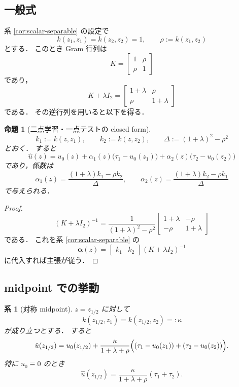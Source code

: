 \documentclass[a4paper,11pt]{bxjsarticle}
\newtheorem{proposition}[theorem]{命題}
\newtheorem{corollary}[theorem]{系}
\theoremstyle{definition}
\begin{document}
\subsection{一般式}

系 \ref{cor:scalar-separable} の設定で
\[
k(z_1,z_1)=k(z_2,z_2)=1,\qquad \rho:=k(z_1,z_2)
\]
とする．
このとき Gram 行列は
\[
K=
\begin{bmatrix}
1 & \rho\\
\rho & 1
\end{bmatrix}
\]
であり，
\[
K+\lambda I_2=
\begin{bmatrix}
1+\lambda & \rho\\
\rho & 1+\lambda
\end{bmatrix}
\]
である．
その逆行列を用いると以下を得る．

\begin{proposition}[二点学習・一点テストの closed form]
\label{prop:two-point-closed}
\[
k_1:=k(z,z_1),\qquad k_2:=k(z,z_2),\qquad
\Delta:=(1+\lambda)^2-\rho^2
\]
とおく．
すると
\[
\hat u(z)=u_0(z)+\alpha_1(z)\bigl(\tau_1-u_0(z_1)\bigr)+\alpha_2(z)\bigl(\tau_2-u_0(z_2)\bigr)
\]
であり，係数は
\[
\alpha_1(z)=\frac{(1+\lambda)k_1-\rho k_2}{\Delta},
\qquad
\alpha_2(z)=\frac{(1+\lambda)k_2-\rho k_1}{\Delta}
\]
で与えられる．
\end{proposition}

\begin{proof}
\[
(K+\lambda I_2)^{-1}
=
\frac{1}{(1+\lambda)^2-\rho^2}
\begin{bmatrix}
1+\lambda & -\rho\\
-\rho & 1+\lambda
\end{bmatrix}
\]
である．
これを系 \ref{cor:scalar-separable} の
\[
\bm{\alpha}(z)=\begin{bmatrix}k_1 & k_2\end{bmatrix}(K+\lambda I_2)^{-1}
\]
に代入すれば主張が従う．
\end{proof}

\subsection{midpoint での挙動}

\begin{corollary}[対称 midpoint]
\label{cor:midpoint}
$z=z_{1/2}$ に対して
\[
k(z_{1/2},z_1)=k(z_{1/2},z_2)=:\kappa
\]
が成り立つとする．
すると
\[
\hat u(z_{1/2})
=
u_0(z_{1/2})
+
\frac{\kappa}{1+\lambda+\rho}
\Bigl((\tau_1-u_0(z_1))+(\tau_2-u_0(z_2))\Bigr).
\]
特に $u_0\equiv 0$ のとき
\[
\hat u(z_{1/2})
=
\frac{\kappa}{1+\lambda+\rho}(\tau_1+\tau_2).
\]
\end{corollary}
\end{document}
